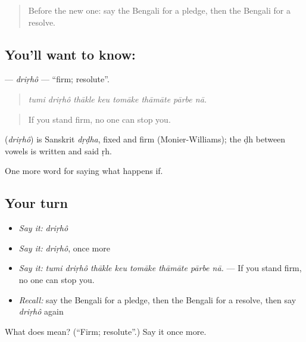 \begin{quote}
Before the new one: say the Bengali for a pledge, then the Bengali for a resolve.
\end{quote}

\subsection*{You'll want to know: }
\textbf{} — \emph{driṛhô} — \textquotedblleft{}firm; resolute\textquotedblright{}.

\begin{quote}
       
\end{quote}

\begin{quote}
\emph{tumi driṛhô thākle keu tomāke thāmāte pārbe nā.}
\end{quote}

\begin{quote}
If you stand firm, no one can stop you.
\end{quote}

\begin{cousinweb}
\textbf{} (\emph{driṛhô}) is Sanskrit \emph{dṛḍha}, fixed and firm (Monier-Williams); the ḍh between vowels is written  and said ṛh.
\end{cousinweb}

\begin{grammarlens}[title={What you've built}]
One more word for saying what happens if.
\end{grammarlens}

\subsection*{Your turn}
\begin{itemize}
\raggedright
  \item \emph{Say it:} \emph{driṛhô}
  \item \emph{Say it:} \emph{driṛhô}, once more
  \item \emph{Say it:} \emph{tumi driṛhô thākle keu tomāke thāmāte pārbe nā.} — If you stand firm, no one can stop you.
  \item \emph{Recall:} say the Bengali for a pledge, then the Bengali for a resolve, then say \emph{driṛhô} again
\end{itemize}

\begin{tcolorbox}[breakable,colback=teal!4,colframe=teal!35!black,title={Before you move on}]
What does  mean? (\textquotedblleft{}Firm; resolute\textquotedblright{}.) Say it once more.
\end{tcolorbox}
